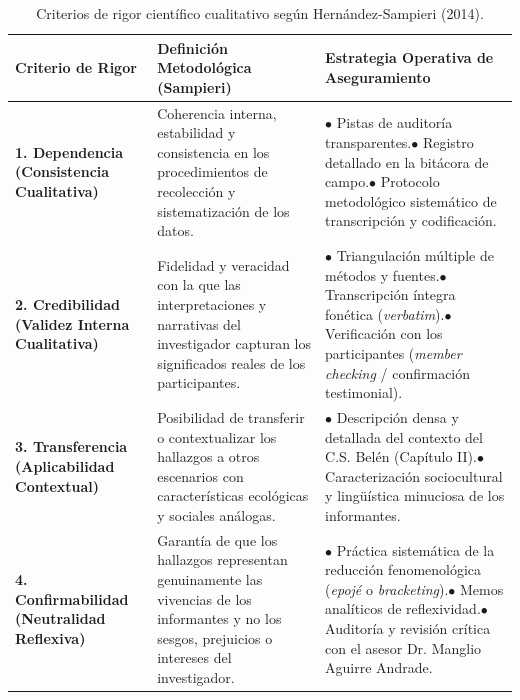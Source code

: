 \begin{table}[H]
\centering
\small
\begin{tabularx}{\textwidth}{p{3.2cm}Xp{5.5cm}}
\toprule
\textbf{Criterio de Rigor} & \textbf{Definición Metodológica (Sampieri)} & \textbf{Estrategia Operativa de Aseguramiento} \\
\midrule
\textbf{1. Dependencia (Consistencia Cualitativa)} & Coherencia interna, estabilidad y consistencia en los procedimientos de recolección y sistematización de los datos. & $\bullet$ Pistas de auditoría transparentes.\newline $\bullet$ Registro detallado en la bitácora de campo.\newline $\bullet$ Protocolo metodológico sistemático de transcripción y codificación. \\
\addlinespace
\textbf{2. Credibilidad (Validez Interna Cualitativa)} & Fidelidad y veracidad con la que las interpretaciones y narrativas del investigador capturan los significados reales de los participantes. & $\bullet$ Triangulación múltiple de métodos y fuentes.\newline $\bullet$ Transcripción íntegra fonética (\textit{verbatim}).\newline $\bullet$ Verificación con los participantes (\textit{member checking} / confirmación testimonial). \\
\addlinespace
\textbf{3. Transferencia (Aplicabilidad Contextual)} & Posibilidad de transferir o contextualizar los hallazgos a otros escenarios con características ecológicas y sociales análogas. & $\bullet$ Descripción densa y detallada del contexto del C.S. Belén (Capítulo II).\newline $\bullet$ Caracterización sociocultural y lingüística minuciosa de los informantes. \\
\addlinespace
\textbf{4. Confirmabilidad (Neutralidad Reflexiva)} & Garantía de que los hallazgos representan genuinamente las vivencias de los informantes y no los sesgos, prejuicios o intereses del investigador. & $\bullet$ Práctica sistemática de la reducción fenomenológica (\textit{epojé} o \textit{bracketing}).\newline $\bullet$ Memos analíticos de reflexividad.\newline $\bullet$ Auditoría y revisión crítica con el asesor Dr. Manglio Aguirre Andrade. \\
\bottomrule
\end{tabularx}
\caption{Criterios de rigor científico cualitativo según Hernández-Sampieri (2014).}
\label{tab:rigor_cualitativo}
\end{table}

